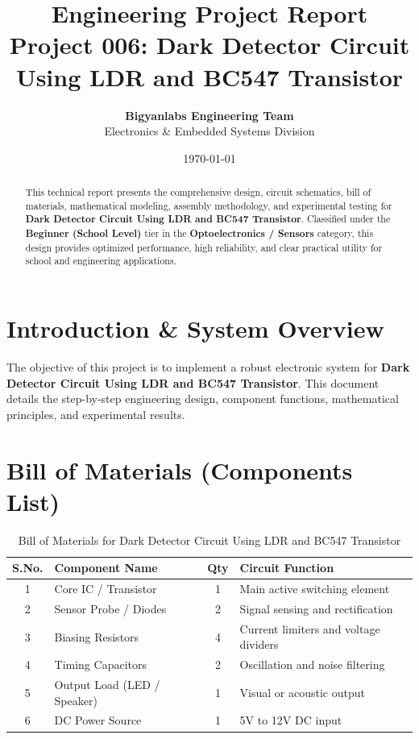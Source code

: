 \documentclass[11pt,a4paper]{article}
\title{\textbf{\Huge Engineering Project Report}\\[0.5em] \Large Project 006: Dark Detector Circuit Using LDR and BC547 Transistor}
\author{\textbf{Bigyanlabs Engineering Team}\\ Electronics \& Embedded Systems Division}
\date{\today}
\begin{document}
\maketitle
\thispagestyle{empty}

\begin{abstract}
This technical report presents the comprehensive design, circuit schematics, bill of materials, mathematical modeling, assembly methodology, and experimental testing for \textbf{Dark Detector Circuit Using LDR and BC547 Transistor}. Classified under the \textbf{Beginner (School Level)} tier in the \textbf{Optoelectronics / Sensors} category, this design provides optimized performance, high reliability, and clear practical utility for school and engineering applications.
\end{abstract}

\newpage
\tableofcontents
\newpage

\section{Introduction \& System Overview}
The objective of this project is to implement a robust electronic system for \textbf{Dark Detector Circuit Using LDR and BC547 Transistor}. This document details the step-by-step engineering design, component functions, mathematical principles, and experimental results.

\section{Bill of Materials (Components List)}
\begin{table}[h!]
\centering
\caption{Bill of Materials for Dark Detector Circuit Using LDR and BC547 Transistor}
\vspace{0.5em}
\begin{tabular}{clcp{7cm}}
\toprule
\textbf{S.No.} & \textbf{Component Name} & \textbf{Qty} & \textbf{Circuit Function} \\
\midrule
1 & Core IC / Transistor & 1 & Main active switching element \\
2 & Sensor Probe / Diodes & 2 & Signal sensing and rectification \\
3 & Biasing Resistors & 4 & Current limiters and voltage dividers \\
4 & Timing Capacitors & 2 & Oscillation and noise filtering \\
5 & Output Load (LED / Speaker) & 1 & Visual or acoustic output \\
6 & DC Power Source & 1 & 5V to 12V DC input \\
\bottomrule
\end{tabular}
\end{table}
\end{document}

